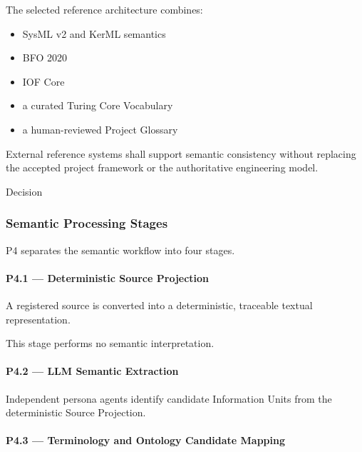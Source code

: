 The selected reference architecture combines:

\begin{itemize}
\tightlist
\item
  SysML v2 and KerML semantics
\item
  BFO 2020
\item
  IOF Core
\item
  a curated Turing Core Vocabulary
\item
  a human-reviewed Project Glossary
\end{itemize}

External reference systems shall support semantic consistency without replacing the accepted project framework or the authoritative engineering model.

Decision

\hypertarget{semantic-processing-stages}{%
\subsubsection{Semantic Processing Stages}\label{semantic-processing-stages}}

P4 separates the semantic workflow into four stages.

\hypertarget{p41--deterministic-source-projection}{%
\paragraph{P4.1 --- Deterministic Source Projection}\label{p41--deterministic-source-projection}}

A registered source is converted into a deterministic, traceable textual representation.

This stage performs no semantic interpretation.

\hypertarget{p42--llm-semantic-extraction}{%
\paragraph{P4.2 --- LLM Semantic Extraction}\label{p42--llm-semantic-extraction}}

Independent persona agents identify candidate Information Units from the deterministic Source Projection.

\hypertarget{p43--terminology-and-ontology-candidate-mapping}{%
\paragraph{P4.3 --- Terminology and Ontology Candidate Mapping}\label{p43--terminology-and-ontology-candidate-mapping}}

